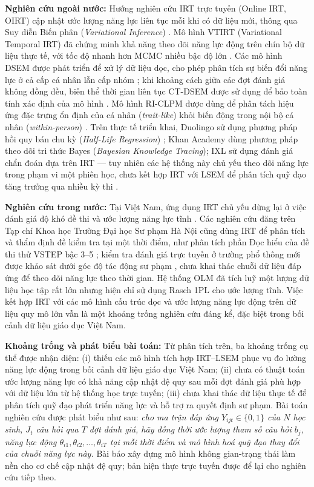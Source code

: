 \textbf{Nghiên cứu ngoài nước:} Hướng nghiên cứu IRT trực tuyến (Online IRT, OIRT) cập nhật ước lượng năng lực liên tục mỗi khi có dữ liệu mới, thông qua Suy diễn Biến phân (\emph{Variational Inference}) \cite{pengwei2022}. Mô hình VTIRT (Variational Temporal IRT) đã chứng minh khả năng theo dõi năng lực động trên chín bộ dữ liệu thực tế, với tốc độ nhanh hơn MCMC nhiều bậc độ lớn \cite{kim2023}. Các mô hình DSEM được phát triển để xử lý dữ liệu dọc, cho phép phân tích sự biến đổi năng lực ở cả cấp cá nhân lẫn cấp nhóm \cite{asparouhov2018}; khi khoảng cách giữa các đợt đánh giá không đồng đều, biến thể thời gian liên tục CT-DSEM được sử dụng để bảo toàn tính xác định của mô hình \cite{driver2017}. Mô hình RI-CLPM được dùng để phân tách hiệu ứng đặc trưng ổn định của cá nhân (\emph{trait-like}) khỏi biến động trong nội bộ cá nhân (\emph{within-person}) \cite{hamaker2015}. Trên thực tế triển khai, Duolingo sử dụng phương pháp hồi quy bán chu kỳ (\emph{Half-Life Regression}) \cite{settles2016}; Khan Academy dùng phương pháp theo dõi tri thức Bayes (\emph{Bayesian Knowledge Tracing}); IXL sử dụng đánh giá chẩn đoán dựa trên IRT --- tuy nhiên các hệ thống này chủ yếu theo dõi năng lực trong phạm vi một phiên học, chưa kết hợp IRT với LSEM để phân tích quỹ đạo tăng trưởng qua nhiều kỳ thi \cite{cambium2020}.

\textbf{Nghiên cứu trong nước:} Tại Việt Nam, ứng dụng IRT chủ yếu dừng lại ở việc đánh giá độ khó đề thi và ước lượng năng lực tĩnh \cite{nguyen_tan}. Các nghiên cứu đăng trên Tạp chí Khoa học Trường Đại học Sư phạm Hà Nội cũng dùng IRT để phân tích và thẩm định đề kiểm tra tại một thời điểm, như phân tích phần Đọc hiểu của đề thi thử VSTEP bậc 3--5 \cite{dao2025vstep}; kiểm tra đánh giá trực tuyến ở trường phổ thông mới được khảo sát dưới góc độ tác động sư phạm \cite{ngo2025ofa}, chưa khai thác chuỗi dữ liệu đáp ứng để theo dõi năng lực theo thời gian. Hệ thống OLM đã tích luỹ một lượng dữ liệu học tập rất lớn nhưng hiện chỉ sử dụng Rasch 1PL cho ước lượng tĩnh. Việc kết hợp IRT với các mô hình cấu trúc dọc và ước lượng năng lực động trên dữ liệu quy mô lớn vẫn là một khoảng trống nghiên cứu đáng kể, đặc biệt trong bối cảnh dữ liệu giáo dục Việt Nam.

\textbf{Khoảng trống và phát biểu bài toán:} Từ phân tích trên, ba khoảng trống cụ thể được nhận diện: (i) thiếu các mô hình tích hợp IRT--LSEM phục vụ đo lường năng lực động trong bối cảnh dữ liệu giáo dục Việt Nam; (ii) chưa có thuật toán ước lượng năng lực có khả năng cập nhật đệ quy sau mỗi đợt đánh giá phù hợp với dữ liệu lớn từ hệ thống học trực tuyến; (iii) chưa khai thác dữ liệu thực tế để phân tích quỹ đạo phát triển năng lực và hỗ trợ ra quyết định sư phạm. Bài toán nghiên cứu được phát biểu như sau: \emph{cho ma trận đáp ứng \(Y_{ijt} \in \{0,1\}\) của \(N\) học sinh, \(J_t\) câu hỏi qua \(T\) đợt đánh giá, hãy đồng thời ước lượng tham số câu hỏi \(b_j\), năng lực động \(\theta_{i1}, \theta_{i2}, \dots, \theta_{iT}\) tại mỗi thời điểm và mô hình hoá quỹ đạo thay đổi của chuỗi năng lực này.} Bài báo xây dựng mô hình không gian-trạng thái làm nền cho cơ chế cập nhật đệ quy; bản hiện thực trực tuyến được để lại cho nghiên cứu tiếp theo.

